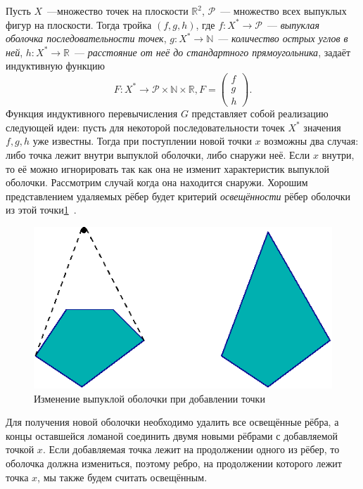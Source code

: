Пусть $X$~---множество точек на плоскости $\mathbb{R}^2$, $\mathcal{P}$~---
множество всех выпуклых фигур на плоскости. Тогда тройка $(f,g,h)$, где
$f\colon X^* \rightarrow \mathcal{P}$~---
\emph{выпуклая оболочка последовательности точек},
$g\colon X^* \rightarrow \mathbb{N}$~--- \emph{количество острых углов в ней},
$h\colon X^* \rightarrow \mathbb{R}$~---
\emph{расстояние от неё до стандартного прямоугольника}, задаёт индуктивную
функцию $$F\colon X^* \rightarrow \mathcal{P} \times \mathbb{N} \times
\mathbb{R}, F = \begin{pmatrix}f\\ g\\ h\end{pmatrix}.$$
Функция индуктивного перевычисления $G$ представляет собой реализацию следующей
идеи: пусть для некоторой последовательности точек $X^*$ значения $f,g,h$ уже известны.
Тогда при поступлении новой точки $x$ возможны два случая:
либо точка лежит внутри выпуклой оболочки, либо снаружи неё. Если $x$ внутри,
то её можно игнорировать так как она не изменит характеристик выпуклой оболочки.
Рассмотрим случай когда она находится снаружи. Хорошим представлением удаляемых рёбер будет критерий \emph{освещённости} рёбер оболочки из этой точки\ref{fig:conv_light}~.
\begin{figure}[ht!]
\begin{center}
\includegraphics[scale=0.6]{images/conv_a_2}
\end{center}
\vspace*{-8mm}
\caption{Изменение выпуклой оболочки при добавлении точки}\label{fig:conv_light}
\end{figure}

Для получения новой оболочки необходимо удалить все освещённые рёбра, а концы
оставшейся ломаной соединить двумя новыми рёбрами с добавляемой точкой $x$.
Если добавляемая точка лежит на продолжении одного из рёбер, то оболочка должна
измениться, поэтому ребро, на продолжении которого лежит точка $x$, мы также будем
считать освещённым.

